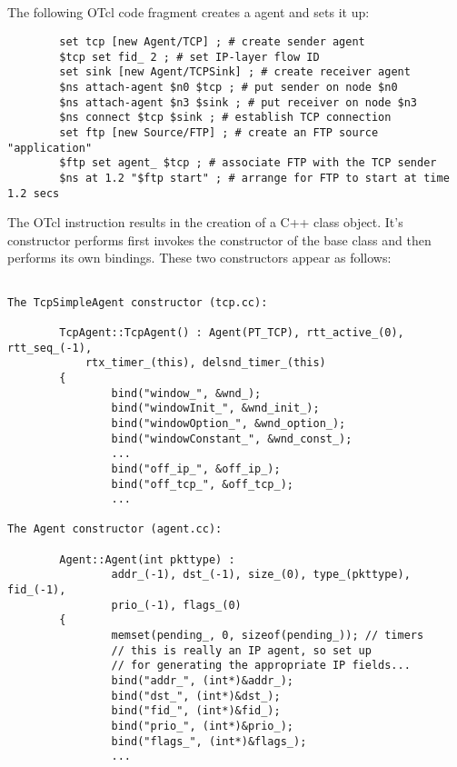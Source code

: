 \subsection{}

The following OTcl code fragment creates a  agent
and sets it up:
\begin{small}
\begin{verbatim}
        set tcp [new Agent/TCP] ; # create sender agent
        $tcp set fid_ 2 ; # set IP-layer flow ID
        set sink [new Agent/TCPSink] ; # create receiver agent
        $ns attach-agent $n0 $tcp ; # put sender on node $n0
        $ns attach-agent $n3 $sink ; # put receiver on node $n3
        $ns connect $tcp $sink ; # establish TCP connection
        set ftp [new Source/FTP] ; # create an FTP source "application"
        $ftp set agent_ $tcp ; # associate FTP with the TCP sender
        $ns at 1.2 "$ftp start" ; # arrange for FTP to start at time 1.2 secs
\end{verbatim}
\end{small}
The OTcl instruction  results in the
creation of a C++  class object.
It's constructor performs first invokes the constructor of the
 base class and then performs its own bindings.
These two constructors appear as follows:
\begin{small}
\begin{verbatim}

The TcpSimpleAgent constructor (tcp.cc):

        TcpAgent::TcpAgent() : Agent(PT_TCP), rtt_active_(0), rtt_seq_(-1),
			rtx_timer_(this), delsnd_timer_(this)
        {
                bind("window_", &wnd_);
                bind("windowInit_", &wnd_init_);
                bind("windowOption_", &wnd_option_);
                bind("windowConstant_", &wnd_const_);
                ...
                bind("off_ip_", &off_ip_);
                bind("off_tcp_", &off_tcp_);
                ...

The Agent constructor (agent.cc):

        Agent::Agent(int pkttype) : 
                addr_(-1), dst_(-1), size_(0), type_(pkttype), fid_(-1),
                prio_(-1), flags_(0)
        {
                memset(pending_, 0, sizeof(pending_)); // timers
                // this is really an IP agent, so set up
                // for generating the appropriate IP fields...
                bind("addr_", (int*)&addr_);
                bind("dst_", (int*)&dst_);
                bind("fid_", (int*)&fid_);
                bind("prio_", (int*)&prio_);
                bind("flags_", (int*)&flags_);
                ...
\end{verbatim}
\end{small}
